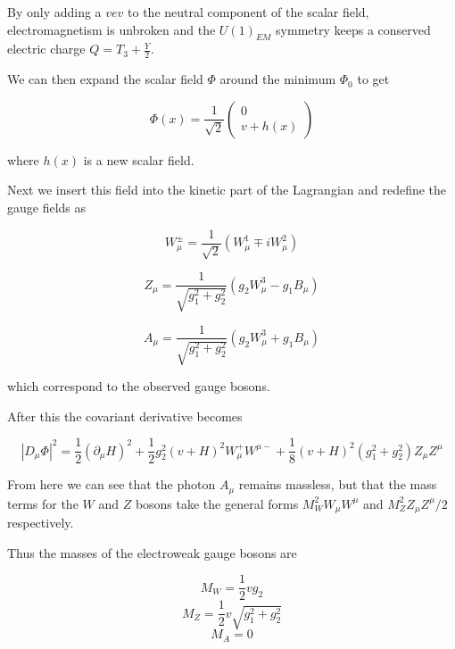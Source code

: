 	
	By only adding a $vev$ to the neutral component of the scalar field, electromagnetism is unbroken and the $U(1)_{EM}$ symmetry keeps a conserved electric charge $Q=T_{3}+\frac{Y}{2}$.

	We can then expand the scalar field $\Phi$ around the minimum $\Phi_{0}$ to get 

		\begin{equation}
			\Phi(x) = \frac{1}{\sqrt{2}}\begin{pmatrix} 0 \\ v + h(x) \end{pmatrix}
		\end{equation}

	where $h(x)$ is a new scalar field.

	Next we insert this field into the kinetic part of the Lagrangian and redefine the gauge fields as 

		\begin{equation}
		W_{\mu}^{\pm} = \frac{1}{\sqrt{2}}(W_{\mu}^{1}\mp iW_{\mu}^{2})
		\end{equation}

		\begin{equation}
		Z_{\mu} = \frac{1}{\sqrt{g_{1}^{2}+g_{2}^{2}}}(g_{2}W_{\mu}^{3}-g_{1}B_{\mu})
		\end{equation}

		\begin{equation}
		A_{\mu} = \frac{1}{\sqrt{g_{1}^{2}+g_{2}^{2}}}(g_{2}W_{\mu}^{3}+g_{1}B_{\mu})
		\end{equation}

		which correspond to the observed gauge bosons. 

	After this the covariant derivative becomes

		\begin{equation}
		|D_{\mu}\Phi|^{2} = \frac{1}{2}(\partial_{\mu}H)^{2}+\frac{1}{2}g_{2}^{2}(v+H)^{2}W_{\mu}^{+}W^{\mu-}+\frac{1}{8}(v+H)^{2}(g_{1}^{2}+g_{2}^{2})Z_{\mu}Z^{\mu}
		\end{equation}

	From here we can see that the photon $A_{\mu}$ remains massless, but that the mass terms for the $W$ and $Z$ bosons take the general forms $M_{W}^{2}W_{\mu}W^{\mu}$ and $M_{Z}^{2}Z_{\mu}Z^{\mu}/2$ respectively.

	Thus the masses of the electroweak gauge bosons are

		\begin{equation}
		M_{W} = \frac{1}{2}vg_{2}
		\end{equation}
		\begin{equation}
		M_{Z}= \frac{1}{2}v\sqrt{g_{1}^{2}+g_{2}^{2}}
		\end{equation}
		\begin{equation}
		M_{A} = 0
		\end{equation}


